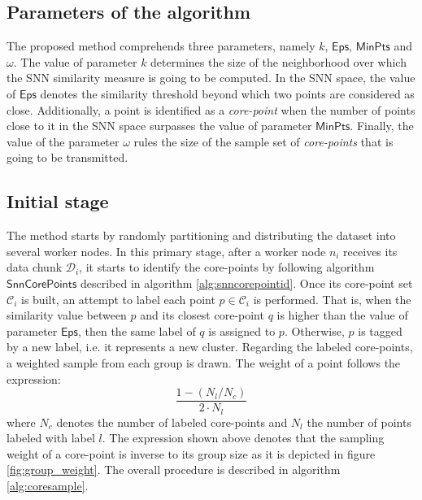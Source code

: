 \documentclass[a4paper]{article}
\begin{document}
\subsection*{Parameters of the algorithm}
The proposed method comprehends three parameters, namely $k$, $\mathsf{Eps}$, $\mathsf{MinPts}$ and $\omega$. The value of parameter $k$ determines the size of the neighborhood over which the SNN similarity measure is going to be computed. In the SNN space, the value of $\mathsf{Eps}$ denotes the similarity threshold beyond which two points are considered as close. Additionally, a point is identified as a \textit{core-point} when the number of points close to it in the SNN space surpasses the value of parameter $\mathsf{MinPts}$. Finally, the value of the  parameter $\omega$ rules the size of the sample set of \textit{core-points} that is going to be transmitted.

\subsection*{Initial stage}
The method starts by randomly partitioning and distributing the dataset into several worker nodes.
In this primary stage, after a worker node $n_i$ receives its data chunk $\mathcal{D}_i$, it starts to identify the core-points by following algorithm $\mathsf{SnnCorePoints}$ described in algorithm \ref{alg:snncorepointid}. 
Once its core-point set $\mathcal{C}_i$ is built, an attempt to label each point $p\in \mathcal{C}_i$ is performed. That is, when the similarity value between $p$ and its closest core-point $q$ is higher than the value of parameter $\mathsf{Eps}$, then the same label of $q$ is assigned to $p$. Otherwise, $p$ is tagged by a new label, i.e. it represents a new cluster.
Regarding the labeled core-points, a weighted sample from each group is drawn. The weight of a point  follows the expression:\[\dfrac{1 - ( N_l/N_c ) }{2\cdot N_l}\] where $N_c$ denotes the number of labeled core-points and $N_l$ the number of points labeled with label $l$. The expression shown above denotes that the sampling weight of a core-point is inverse to its group size as it is depicted in figure \ref{fig:group_weight}.
The overall procedure is described in algorithm \ref{alg:coresample}. 
\end{document}
